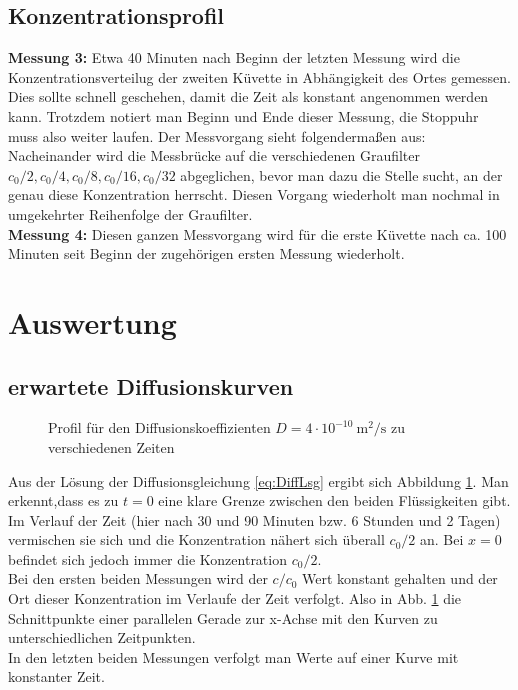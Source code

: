 \documentclass[12pt,a4paper,titlepage,headinclude,bibtotoc]{scrartcl}
\begin{document}
\subsection{Konzentrationsprofil}
\textbf{Messung 3:}
Etwa 40 Minuten nach Beginn der letzten Messung wird die Konzentrationsverteilug der zweiten Küvette in Abhängigkeit des Ortes gemessen.
Dies sollte schnell geschehen, damit die Zeit als konstant angenommen werden kann.
Trotzdem notiert man Beginn und Ende dieser Messung, die Stoppuhr muss also weiter laufen.
Der Messvorgang sieht folgendermaßen aus:
Nacheinander wird die Messbrücke auf die verschiedenen Graufilter $c_0/2, c_0/4, c_0/8, c_0/16, c_0/32$ abgeglichen, bevor man dazu die Stelle sucht, an der genau diese Konzentration herrscht.
Diesen Vorgang wiederholt man nochmal in umgekehrter Reihenfolge der Graufilter.\\
\textbf{Messung 4:}
Diesen ganzen Messvorgang wird für die erste Küvette nach ca. 100 Minuten  seit Beginn der zugehörigen ersten Messung wiederholt. 

\section{Auswertung}
\label{sec:auswertung}
\subsection{erwartete Diffusionskurven}
\begin{figure}
	\centering	
	
	\caption{Profil für den Diffusionskoeffizienten $D=4\cdot 10^{-10} ~ \si{\meter ^2 / \second}$ zu verschiedenen Zeiten}
	\label{fig:erwDiffKurve}
\end{figure}

Aus der Lösung der Diffusionsgleichung \eqref{eq:DiffLsg} ergibt sich Abbildung \ref{fig:erwDiffKurve}.
Man erkennt,dass es zu $t=0$ eine klare Grenze zwischen den beiden Flüssigkeiten gibt.
Im Verlauf der Zeit (hier nach 30 und 90 Minuten bzw. 6 Stunden und 2 Tagen) vermischen sie sich und die Konzentration nähert sich überall $c_0/2$ an.
Bei $x=0$ befindet sich jedoch immer die Konzentration $c_0/2$.\\
Bei den ersten beiden Messungen wird der $c/c_0$ Wert konstant gehalten und der Ort dieser Konzentration im Verlaufe der Zeit verfolgt.
Also in Abb. \ref{fig:erwDiffKurve} die Schnittpunkte einer parallelen Gerade zur x-Achse mit den Kurven zu unterschiedlichen Zeitpunkten.\\
In den letzten beiden Messungen verfolgt man Werte auf einer Kurve mit konstanter Zeit.
\end{document}
